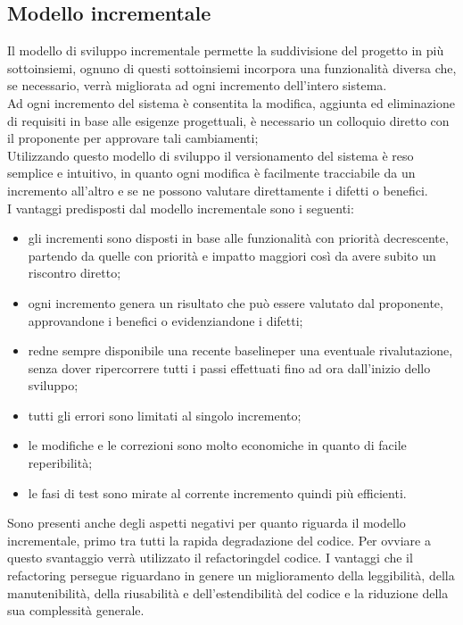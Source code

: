 \subsection{Modello incrementale}
Il modello di sviluppo incrementale permette la suddivisione del progetto in più sottoinsiemi,
ognuno di questi sottoinsiemi incorpora una funzionalità diversa che, se necessario, verrà migliorata ad ogni incremento dell'intero 
sistema.  \\
Ad ogni incremento del sistema è consentita la modifica, aggiunta ed eliminazione di requisiti in base alle esigenze progettuali, 
è necessario un colloquio diretto con il proponente per approvare tali cambiamenti; \\
Utilizzando questo modello di sviluppo il versionamento del sistema è reso semplice e intuitivo, in quanto ogni modifica è facilmente tracciabile da un incremento all'altro e se ne possono valutare direttamente i difetti o benefici.\\
I vantaggi predisposti dal modello incrementale sono i seguenti:
\begin{itemize}
	\item gli incrementi sono disposti in base alle funzionalità con priorità decrescente, partendo da quelle con priorità e impatto maggiori
	così da avere subito un riscontro diretto;
	\item ogni incremento genera un risultato che può essere valutato dal proponente, approvandone i benefici o evidenziandone i difetti;
	\item redne sempre disponibile una recente baseline\glosp per una eventuale rivalutazione, senza dover ripercorrere tutti i passi effettuati fino ad ora dall'inizio dello sviluppo;
	\item tutti gli errori sono limitati al singolo incremento;
	\item le modifiche e le correzioni sono molto economiche in quanto di facile reperibilità;
	\item le fasi di test sono mirate al corrente incremento quindi più efficienti.
\end{itemize}
Sono presenti anche degli aspetti negativi per quanto riguarda il modello incrementale, primo tra tutti la rapida degradazione del codice. Per ovviare a questo svantaggio verrà utilizzato il refactoring\glosp del codice. I vantaggi che il refactoring persegue riguardano in genere un miglioramento della leggibilità, della manutenibilità, della riusabilità e dell'estendibilità del codice e la riduzione della sua complessità generale.


